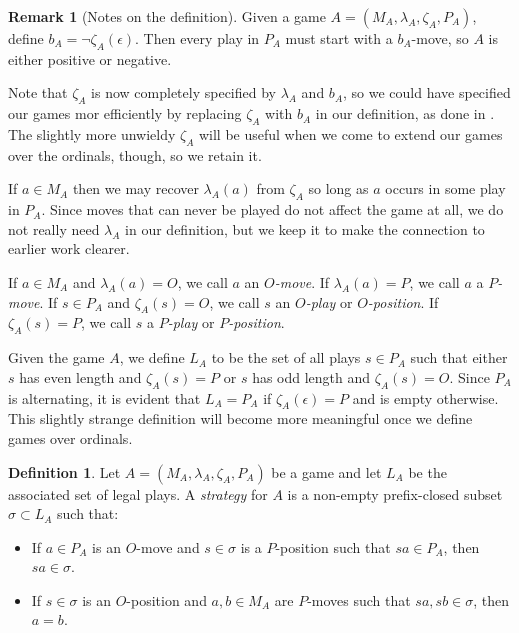 \documentclass[11pt]{article} %
\theoremstyle{plain} %
\theoremstyle{definition} %
\newtheorem{definition}[theorem]{Definition}
\newtheorem{remark}[theorem]{Remark}
\theoremstyle{exercisestyle}
\newcommand{\emptyplay}{\epsilon}
\begin{document}
\begin{remark}[Notes on the definition]
  Given a game $A=(M_A,\lambda_A,\zeta_A,P_A)$, define $b_A=\neg\zeta_A(\emptyplay)$.  Then every play in $P_A$ must start with a $b_A$-move, so $A$ is either positive or negative.

  Note that $\zeta_A$ is now completely specified by $\lambda_A$ and $b_A$, so we could have specified our games mor efficiently by replacing $\zeta_A$ with $b_A$ in our definition, as done in \cite{martinsthesis}.  The slightly more unwieldy $\zeta_A$ will be useful when we come to extend our games over the ordinals, though, so we retain it.

  If $a\in M_A$ then we may recover $\lambda_A(a)$ from $\zeta_A$ so long as $a$ occurs in some play in $P_A$.  Since moves that can never be played do not affect the game at all, we do not really need $\lambda_A$ in our definition, but we keep it to make the connection to earlier work clearer.

  If $a\in M_A$ and $\lambda_A(a)=O$, we call $a$ an \emph{$O$-move}.  If $\lambda_A(a)=P$, we call $a$ a \emph{$P$-move}.  If $s\in P_A$ and $\zeta_A(s)=O$, we call $s$ an \emph{$O$-play} or \emph{$O$-position}.  If $\zeta_A(s)=P$, we call $s$ a \emph{$P$-play} or \emph{$P$-position}.

  Given the game $A$, we define $L_A$ to be the set of all plays $s\in P_A$ such that either $s$ has even length and $\zeta_A(s)=P$ or $s$ has odd length and $\zeta_A(s)=O$.  Since $P_A$ is alternating, it is evident that $L_A=P_A$ if $\zeta_A(\emptyplay) = P$ and is empty otherwise.  This slightly strange definition will become more meaningful once we define games over ordinals.  
\end{remark}

\begin{definition}
  Let $A=(M_A,\lambda_A,\zeta_A,P_A)$ be a game and let $L_A$ be the associated set of legal plays.  A \emph{strategy} for $A$ is a non-empty prefix-closed subset $\sigma\subset L_A$ such that:
  \begin{itemize}
    \item If $a\in P_A$ is an $O$-move and $s\in\sigma$ is a $P$-position such that $sa\in P_A$, then $sa\in\sigma$.
    \item If $s\in\sigma$ is an $O$-position and $a,b\in M_A$ are $P$-moves such that $sa,sb\in\sigma$, then $a=b$.
  \end{itemize}
\end{definition}
\end{document}
